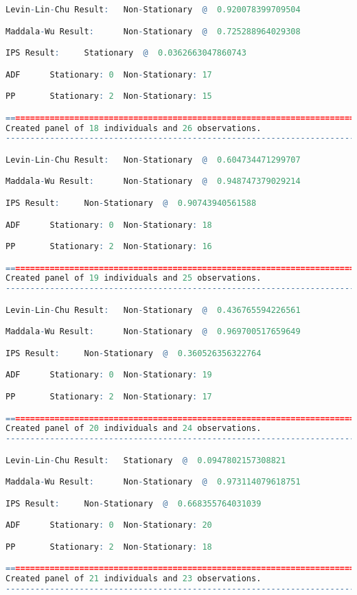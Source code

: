 \begin{lstlisting}[language=R]
Levin-Lin-Chu Result:   Non-Stationary  @  0.920078399709504

Maddala-Wu Result:      Non-Stationary  @  0.725288964029308

IPS Result:     Stationary  @  0.0362663047860743

ADF      Stationary: 0  Non-Stationary: 17

PP       Stationary: 2  Non-Stationary: 15

=========================================================================
Created panel of 18 individuals and 26 observations.
-------------------------------------------------------------------------

Levin-Lin-Chu Result:   Non-Stationary  @  0.604734471299707

Maddala-Wu Result:      Non-Stationary  @  0.948747379029214

IPS Result:     Non-Stationary  @  0.90743940561588

ADF      Stationary: 0  Non-Stationary: 18

PP       Stationary: 2  Non-Stationary: 16

=========================================================================
Created panel of 19 individuals and 25 observations.
-------------------------------------------------------------------------

Levin-Lin-Chu Result:   Non-Stationary  @  0.436765594226561

Maddala-Wu Result:      Non-Stationary  @  0.969700517659649

IPS Result:     Non-Stationary  @  0.360526356322764

ADF      Stationary: 0  Non-Stationary: 19

PP       Stationary: 2  Non-Stationary: 17

=========================================================================
Created panel of 20 individuals and 24 observations.
-------------------------------------------------------------------------

Levin-Lin-Chu Result:   Stationary  @  0.0947802157308821

Maddala-Wu Result:      Non-Stationary  @  0.973114079618751

IPS Result:     Non-Stationary  @  0.668355764031039

ADF      Stationary: 0  Non-Stationary: 20

PP       Stationary: 2  Non-Stationary: 18

=========================================================================
Created panel of 21 individuals and 23 observations.
-------------------------------------------------------------------------


\end{lstlisting}
